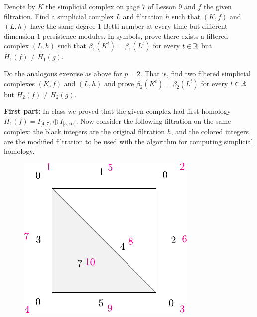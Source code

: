 \documentclass[twoside,10pt]{article}
\begin{document}

\begin{exer}
Denote by $K$ the simplicial complex on page $7$ of Lesson $9$ and $f$ the given filtration. Find a simplicial complex $L$ and filtration $h$ such that $(K, f)$ and $(L, h)$ have the same degree-$1$ Betti number at every time but different dimension $1$ persistence modules. In symbols, prove there exists a filtered complex $(L, h)$ such that $\beta_1(K^t) = \beta_1(L^t)$ for every $t \in \mathbb{R}$ but $H_1(f) \neq H_1(g)$.

	Do the analogous exercise as above for $p=2$. That is, find two filtered simplicial complexes $(K, f)$ and $(L, h)$ and prove $\beta_2(K^t) = \beta_2(L^t)$ for every $t \in \mathbb{R}$ but $H_2(f) \neq H_2(g)$.
\end{exer}

\textbf{First part:} In class we proved that the given complex had first homology $H_1(f) = I_{[4,7)} \oplus I_{[5,\infty)}$. Now consider the following filtration on the same complex: the black integers are the original filtration $h$, and the colored integers are the modified filtration to be used with the algorithm for computing simplicial homology.

\begin{figure}[H]
	\centering
	\includegraphics[scale=1]{fig/1a.pdf}
\end{figure}
\end{document}
